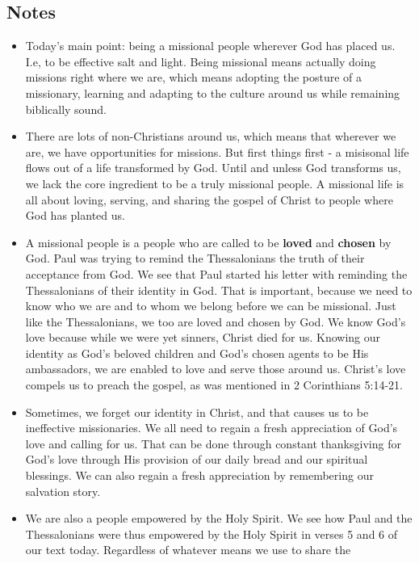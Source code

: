\subsection*{Notes}
\begin{itemize}
  \item{Today's main point: being a missional people wherever God has placed
  us.  I.e, to be effective salt and light.  Being missional means actually
  doing missions right where we are, which means adopting the posture of a
  missionary, learning and adapting to the culture around us while remaining
  biblically sound.}
  \item{There are lots of non-Christians around us, which means that wherever
  we are, we have opportunities for missions.  But first things first - a
  misisonal life flows out of a life transformed by God.  Until and unless
  God transforms us, we lack the core ingredient to be a truly missional
  people.  A missional life is all about loving, serving, and sharing the
  gospel of Christ to people where God has planted us.}
  \item{A missional people is a people who are called to be \textbf{loved}
  and \textbf{chosen} by God.  Paul was trying to remind the Thessalonians
  the truth of their acceptance from God.  We see that Paul started his
  letter with reminding the Thessalonians of their identity in God.  That is
  important, because we need to know who we are and to whom we belong before
  we can be missional.  Just like the Thessalonians, we too are loved and
  chosen by God.  We know God's love because while we were yet sinners,
  Christ died for us.  Knowing our identity as God's beloved children and
  God's chosen agents to be His ambassadors, we are enabled to love and serve
  those around us.  Christ's love compels us to preach the gospel, as was
  mentioned in 2 Corinthians 5:14-21.}
  \item{Sometimes, we forget our identity in Christ, and that causes us to be
  ineffective missionaries.  We all need to regain a fresh appreciation of
  God's love and calling for us.  That can be done through constant
  thanksgiving for God's love through His provision of our daily bread and
  our spiritual blessings.  We can also regain a fresh appreciation by
  remembering our salvation story.}
  \item{We are also a people empowered by the Holy Spirit.  We see how Paul
  and the Thessalonians were thus empowered by the Holy Spirit in verses 5
  and 6 of our text today.  Regardless of whatever means we use to share the
}
\end{itemize}
